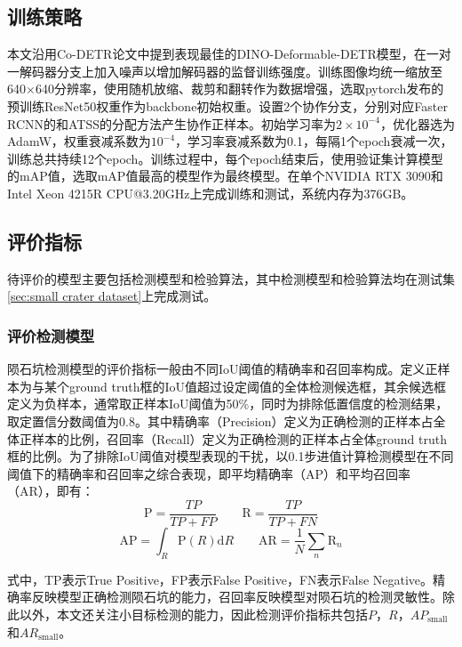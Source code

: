 \subsection{训练策略}
本文沿用Co-DETR\cite{zongDETRsCollaborativeHybrid2023}论文中提到表现最佳的DINO-Deformable-DETR模型，在一对一解码器分支上加入噪声以增加解码器的监督训练强度。训练图像均统一缩放至640$\times$640分辨率，使用随机放缩、裁剪和翻转作为数据增强，选取pytorch发布的预训练ResNet50权重作为backbone初始权重。设置2个协作分支，分别对应Faster RCNN\cite{renFasterRCNNRealtime2015}的和ATSS\cite{zhangBridgingGapAnchorbased2020}的分配方法产生协作正样本。初始学习率为$2\times10^{-4}$，优化器选为AdamW，权重衰减系数为$10^{-4}$，学习率衰减系数为0.1，每隔1个epoch衰减一次，训练总共持续12个epoch。训练过程中，每个epoch结束后，使用验证集计算模型的mAP值，选取mAP值最高的模型作为最终模型。在单个NVIDIA RTX 3090和Intel Xeon 4215R CPU@3.20GHz上完成训练和测试，系统内存为376GB。
\subsection{评价指标}
待评价的模型主要包括检测模型和检验算法，其中检测模型和检验算法均在测试集\ref{sec:small crater dataset}上完成测试。
\subsubsection{评价检测模型}
陨石坑检测模型的评价指标一般由不同IoU阈值的精确率和召回率构成。定义正样本为与某个ground truth框的IoU值超过设定阈值的全体检测候选框，其余候选框定义为负样本，通常取正样本IoU阈值为50\%，同时为排除低置信度的检测结果，取定置信分数阈值为0.8。其中精确率（Precision）定义为正确检测的正样本占全体正样本的比例，召回率（Recall）定义为正确检测的正样本占全体ground truth框的比例。为了排除IoU阈值对模型表现的干扰，以0.1步进值计算检测模型在不同阈值下的精确率和召回率之综合表现，即平均精确率（AP）和平均召回率（AR），即有：
\begin{equation}
  \mathrm{P}=\frac{TP}{TP+FP}\qquad\mathrm{R}=\frac{TP}{TP+FN}
  \label{eq:P and R}
\end{equation}
\begin{equation}
  \mathrm{AP}=\int_R\mathrm{P}(R)\mathrm{d}R\qquad\mathrm{AR}=\frac{1}{N}\sum_n\mathrm{R}_n
  \label{eq:AP and AR}
\end{equation}\par
式中，TP表示True Positive，FP表示False Positive，FN表示False Negative。精确率反映模型正确检测陨石坑的能力，召回率反映模型对陨石坑的检测灵敏性。除此以外，本文还关注小目标检测的能力，因此检测评价指标共包括$P$，$R$，$AP_\mathrm{small}$和$AR_\mathrm{small}$。
